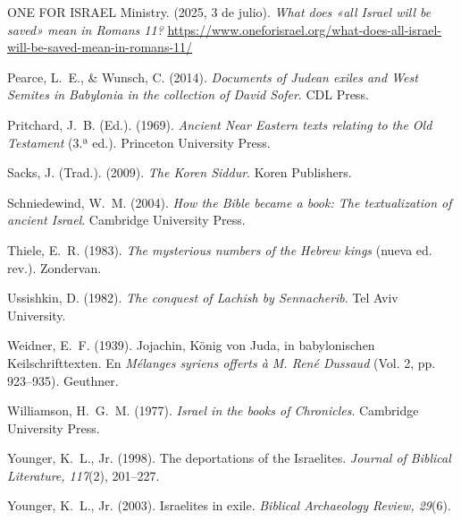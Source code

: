 \documentclass[11pt,letterpaper]{article}
\newcommand{\refapa}[1]{\par{\RaggedRight\hangindent=1.27cm\hangafter=1\noindent #1\par}\vspace{4pt}}
\begin{document}
\refapa{ONE FOR ISRAEL Ministry. (2025, 3 de julio). \emph{What does «all Israel will be saved» mean in Romans 11?} \url{https://www.oneforisrael.org/what-does-all-israel-will-be-saved-mean-in-romans-11/}}
\refapa{Pearce, L.~E., \& Wunsch, C. (2014). \emph{Documents of Judean exiles and West Semites in Babylonia in the collection of David Sofer}. CDL Press.}
\refapa{Pritchard, J.~B. (Ed.). (1969). \emph{Ancient Near Eastern texts relating to the Old Testament} (3.ª ed.). Princeton University Press.}
\refapa{Sacks, J. (Trad.). (2009). \emph{The Koren Siddur}. Koren Publishers.}
\refapa{Schniedewind, W.~M. (2004). \emph{How the Bible became a book: The textualization of ancient Israel}. Cambridge University Press.}
\refapa{Thiele, E.~R. (1983). \emph{The mysterious numbers of the Hebrew kings} (nueva ed. rev.). Zondervan.}
\refapa{Ussishkin, D. (1982). \emph{The conquest of Lachish by Sennacherib}. Tel Aviv University.}
\refapa{Weidner, E.~F. (1939). Jojachin, König von Juda, in babylonischen Keilschrifttexten. En \emph{Mélanges syriens offerts à M. René Dussaud} (Vol. 2, pp. 923--935). Geuthner.}
\refapa{Williamson, H.~G.~M. (1977). \emph{Israel in the books of Chronicles}. Cambridge University Press.}
\refapa{Younger, K.~L., Jr. (1998). The deportations of the Israelites. \emph{Journal of Biblical Literature, 117}(2), 201--227.}
\refapa{Younger, K.~L., Jr. (2003). Israelites in exile. \emph{Biblical Archaeology Review, 29}(6).}
\end{document}
